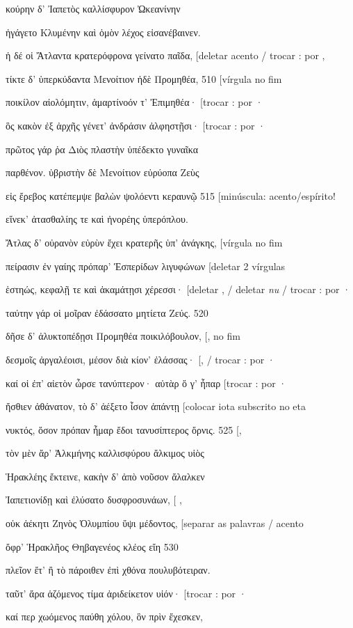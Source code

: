 κούρην δ' Ἰαπετὸς καλλίσφυρον Ὠκεανίνην

ἠγάγετο Κλυμένην καὶ ὁμὸν λέχος εἰσανέβαινεν.

ἡ δέ οἱ Ἄτλαντα κρατερόφρονα γείνατο παῖδα, {[}deletar acento / trocar :
por ,

τίκτε δ' ὑπερκύδαντα Μενοίτιον ἠδὲ Προμηθέα, 510 {[}vírgula no fim

ποικίλον αἰολόμητιν, ἁμαρτίνοόν τ' Ἐπιμηθέα· {[}trocar : por ·

ὃς κακὸν ἐξ ἀρχῆς γένετ' ἀνδράσιν ἀλφηστῇσι· {[}trocar : por ·

πρῶτος γάρ ῥα Διὸς πλαστὴν ὑπέδεκτο γυναῖκα

παρθένον. ὑβριστὴν δὲ Μενοίτιον εὐρύοπα Ζεὺς

εἰς ἔρεβος κατέπεμψε βαλὼν ψολόεντι κεραυνῷ 515 {[}minúscula:
acento/espírito!

εἵνεκ' ἀτασθαλίης τε καὶ ἠνορέης ὑπερόπλου.

Ἄτλας δ' οὐρανὸν εὐρὺν ἔχει κρατερῆς ὑπ' ἀνάγκης, {[}vírgula no fim

πείρασιν ἐν γαίης πρόπαρ' Ἑσπερίδων λιγυφώνων {[}deletar 2 vírgulas

ἑστηώς, κεφαλῇ τε καὶ ἀκαμάτῃσι χέρεσσι· {[}deletar , / deletar
\emph{nu} / trocar : por ·

ταύτην γάρ οἱ μοῖραν ἐδάσσατο μητίετα Ζεύς. 520

δῆσε δ' ἀλυκτοπέδῃσι Προμηθέα ποικιλόβουλον, {[}, no fim

δεσμοῖς ἀργαλέοισι, μέσον διὰ κίον' ἐλάσσας· {[}, / trocar : por ·

καί οἱ ἐπ' αἰετὸν ὦρσε τανύπτερον· αὐτὰρ ὅ γ' ἧπαρ {[}trocar : por ·

ἤσθιεν ἀθάνατον, τὸ δ' ἀέξετο ἶσον ἁπάντῃ {[}colocar iota subscrito no
eta

νυκτός, ὅσον πρόπαν ἦμαρ ἔδοι τανυσίπτερος ὄρνις. 525 {[},

τὸν μὲν ἄρ' Ἀλκμήνης καλλισφύρου ἄλκιμος υἱὸς

Ἡρακλέης ἔκτεινε, κακὴν δ' ἀπὸ νοῦσον ἄλαλκεν

Ἰαπετιονίδῃ καὶ ἐλύσατο δυσφροσυνάων, {[} ,

οὐκ ἀέκητι Ζηνὸς Ὀλυμπίου ὕψι μέδοντος, {[}separar as palavras / acento

ὄφρ' Ἡρακλῆος Θηβαγενέος κλέος εἴη 530

πλεῖον ἔτ' ἢ τὸ πάροιθεν ἐπὶ χθόνα πουλυβότειραν.

ταῦτ' ἄρα ἁζόμενος τίμα ἀριδείκετον υἱόν· {[}trocar : por ·

καί περ χωόμενος παύθη χόλου, ὃν πρὶν ἔχεσκεν,

